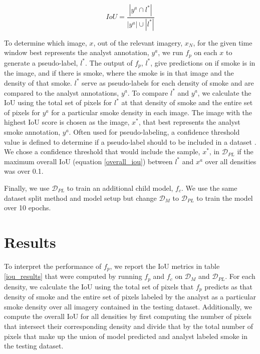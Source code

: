 \documentclass{article}
\begin{document}
\begin{equation} \label{iou}
    IoU = \frac{| y^a \cap l^*|}{|y^a|\cup|l^*|}
\end{equation}

To determine which image, \(x\), out of the relevant imagery, \(x_N\), for the given time window best represents the analyst annotation, \(y^a\), we run \(f_p\) on each \(x\) to generate a pseudo-label, \(l^*\). The output of \(f_p\), \(l^*\), give predictions on if smoke is in the image, and if there is smoke, where the smoke is in that image and the density of that smoke. \(l^*\) serve as pseudo-labels for each density of smoke and are compared to the analyst annotations, \(y^a\). To compare \(l^*\) and \(y^a\), we calculate the IoU using the total set of pixels for \(l^*\) at that density of smoke and the entire set of pixels for \(y^a\) for a particular smoke density in each image. The image with the highest IoU score is chosen as the image, \(x^*\),  that best represents the analyst smoke annotation, \(y^a\). Often used for pseudo-labeling, a confidence threshold value is defined to determine if a pseudo-label should to be included in a dataset \cite{conf_thresh}. We chose a confidence threshold that would include the sample, \(x^*\), in \(\mathcal{D}_{PL}\) if the maximum overall IoU (equation \ref{overall_iou}) between \(l^*\) and \(x^a\) over all densities was over 0.1. 

Finally, we use \(\mathcal{D}_{PL}\) to train an additional child model, \(f_c\). We use the same dataset split method and model setup but change \(\mathcal{D}_M\) to \(\mathcal{D}_{PL}\) to train the model over 10 epochs.

\section*{Results}

To interpret the performance of \(f_p\), we report the IoU metrics in table \ref{iou_results} that were computed by running \(f_p\) and \(f_c\) on \(\mathcal{D}_M\) and \(\mathcal{D}_{PL}\). For each density, we calculate the IoU using the total set of pixels that \(f_p\) predicts as that density of smoke and the entire set of pixels labeled by the analyst as a particular smoke density over all imagery contained in the testing dataset. Additionally, we compute the overall IoU for all densities by first computing the number of pixels that intersect their corresponding density and divide that by the total number of pixels that make up the union of model predicted and analyst labeled smoke in the testing dataset.
\end{document}
